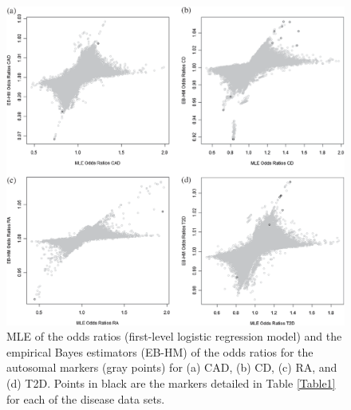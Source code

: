 \documentclass[oupdraft]{bio}
\begin{document}
\begin{figure}[!p]
\centering\includegraphics{fig4.eps}
\caption{MLE of the odds ratios (first-level logistic
regression model) and the empirical Bayes estimators
(EB-HM) of the odds ratios for the autosomal markers
(gray points) for (a) CAD, (b) CD, (c) RA, and (d) T2D.
Points in black are the markers detailed in Table
\protect\ref{Table1} for each of the disease data sets.}
\label{Fig4}
\end{figure}
\end{document}
